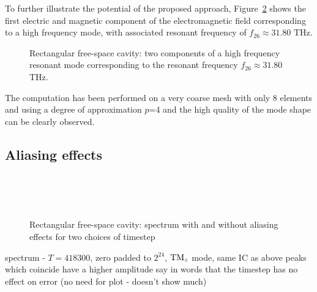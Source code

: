To further illustrate the potential of the proposed approach, Figure~\ref{fig:rectangle2DfreeSpace_modesHF} shows the first electric and magnetic component of the electromagnetic field corresponding to a high frequency mode, with associated resonant frequency of $f_{26} \approx 31.80$ THz. 
\begin{figure}[!ht]
	\centering
	\hspace{1cm}
	\caption{Rectangular free-space cavity: two components of a high frequency resonant mode corresponding to the resonant frequency $f_{26} \approx 31.80$ THz.}
	\label{fig:rectangle2DfreeSpace_modesHF}
\end{figure}
The computation has been performed on a very coarse mesh with only 8 elements and using a degree of approximation $p$=4 and the high quality of the mode shape can be clearly observed.

\clearpage
\subsection{Aliasing effects}
\begin{figure}[!ht]
	\centering
{} \\
 \\
 \\
	\caption{Rectangular free-space cavity: spectrum with and without aliasing
    effects for two choices of timestep}
	\label{fig:rectangle2DfreeSpace_modesHF}
\end{figure}

spectrum - $T = 418300$, zero padded to $2^{ 24 }$, $\textrm{TM}_{z}$ mode, same IC as above
peaks which coincide have a higher amplitude
say in words that the timestep has no effect on error (no need for plot -
doesn't show much)


